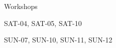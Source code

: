 \documentclass{article}
\newcommand{\room}[1]{
    \noindent
    #1
    \vspace{.2in}

}
\begin{document}
\rssheader[2in]

\vfill

\begin{center}
    \rsshuge
    \room{Workshops}
    \rsstiny
    \room{SAT-04, SAT-05, SAT-10}
    \room{SUN-07, SUN-10, SUN-11, SUN-12}
\end{center}

\rssarrowleft

\vfill
\end{document}

